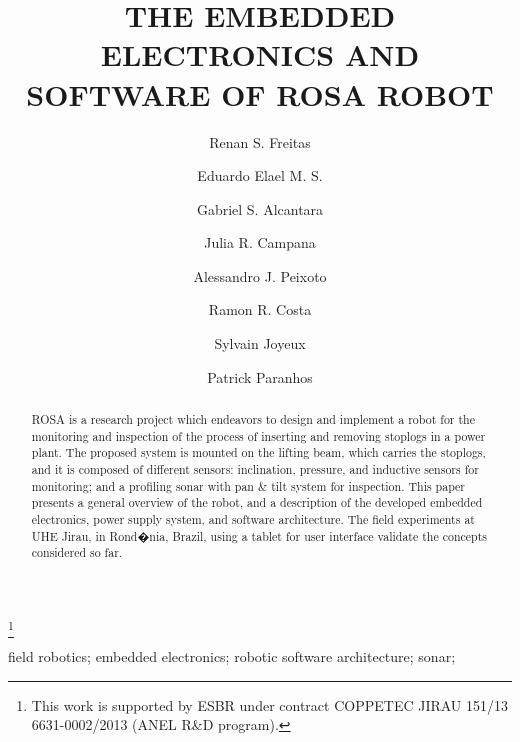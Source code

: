 \documentclass{ifacconf}
\begin{document}
\begin{frontmatter}

\title{THE EMBEDDED ELECTRONICS AND SOFTWARE OF ROSA ROBOT
}

\thanks[footnoteinfo]{This work is supported by ESBR under contract COPPETEC
JIRAU 151/13 6631-0002/2013 (ANEL R\&D program).}

\author[1]{Renan S. Freitas}
\author[1]{Eduardo Elael M. S.}
\author[1]{Gabriel S. Alcantara}
\author[2]{Julia R. Campana}
\author[1]{Alessandro J. Peixoto}
\author[1]{Ramon R. Costa}
\author[3]{Sylvain Joyeux}
\author[3]{Patrick Paranhos}

  \address[1]{Electrical
 Engineering Department, COPPE UFRJ, Rio de Janeiro, Brazil}
  \address[2]{Professional and Technical Communication, Illinois Institute of
  Technology, Illinois, United States} 
  \address[3]{Research Department Robotics Innovation Center, German Research
 Centre for Artificial Intelligence (DFKI), Bremen, Germany}
 
\begin{abstract}                %
ROSA is a research project which endeavors to design and implement a robot for
the monitoring and inspection of the process of inserting and removing stoplogs
in a power plant. The proposed system is mounted on the lifting beam,
which carries the stoplogs, and it is composed of different sensors:
inclination, pressure, and inductive sensors for monitoring; and a profiling
sonar with pan \& tilt system for inspection. This paper presents a general
overview of the robot, and a description of the developed embedded electronics, power supply system,
and software architecture. The field experiments at UHE Jirau, in Rond�nia,
Brazil, using a tablet for user interface validate the concepts considered so far.
\end{abstract}

\begin{keyword}
field robotics; embedded electronics; robotic software architecture; sonar;
\end{keyword}

\end{frontmatter}
 









\appendix
\end{document}
